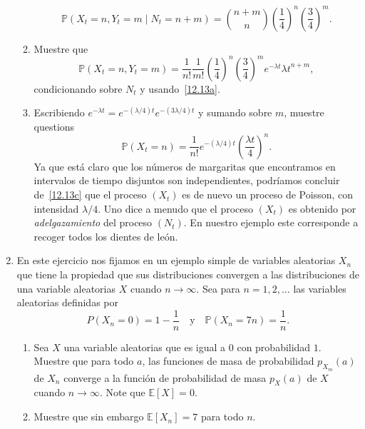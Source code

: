 \begin{enumerate}
\begin{enumerate}
           \begin{equation*}
             \mathds{P}\left(X_t=n,Y_t=m\mid N_t=n+m\right)=\binom{n+m}{n}{\left(\frac{1}{4}\right)}^n{\left(\frac{3}{4}\right)}^m.
           \end{equation*}
         \item Muestre que
           \begin{equation*}
             \mathds{P}\left(X_t=n,Y_t=m\right)=\frac{1}{n!}\frac{1}{m!}{\left(\frac{1}{4}\right)}^n{\left(\frac{3}{4}\right)}^me^{-\lambda t}{\lambda t}^{n+m},
           \end{equation*}
           condicionando sobre $N_t$ y usando~\ref{12.13a}.
         \item Escribiendo $e^{-\lambda t}=e^{-\left(\lambda/4\right)t}e^{-\left(3\lambda/4\right)t}$ y sumando sobre $m$, muestre questions\label{12.13c}
           \begin{equation*}
             \mathds{P}\left(X_t=n\right)=\frac{1}{n!}e^{-\left(\lambda/4\right)t}{\left(\frac{\lambda t}{4}\right)}^n.
           \end{equation*}
           Ya que está claro que los números de margaritas que encontramos en intervalos de tiempo disjuntos son independientes, podríamos concluir de~\ref{12.13c} que el proceso $\left(X_t\right)$ es de nuevo un proceso de Poisson, con intensidad $\lambda/4$. Uno dice a menudo que el proceso $\left(X_t\right)$ es obtenido por \emph{adelgazamiento} del proceso $\left(N_t\right)$. En nuestro ejemplo este corresponde a recoger todos los dientes de león.
         \end{enumerate}
         \item En este ejercicio nos fijamos en un ejemplo simple de variables aleatorias $X_n$ que tiene la propiedad que sus distribuciones convergen a las distribuciones de una variable aleatorias $X$ cuando $n\to\infty$. Sea para $n=1,2,\ldots$ las variables aleatorias definidas por
           \begin{equation*}
             P\left(X_n=0\right)=1-\frac{1}{n}\quad\text{y}\quad\mathds{P}\left(X_n=7n\right)=\frac{1}{n}.
           \end{equation*}
           \begin{enumerate}
           \item Sea $X$ una variable aleatorias que es igual a $0$ con probabilidad $1$. Muestre que para todo $a$, las funciones de masa de probabilidad $p_{X_m}(a)$ de $X_n$ converge a la función de probabilidad de masa $p_X(a)$ de $X$ cuando $n\to\infty$. Note que $\mathds{E}\left[X\right]=0$.
           \item Muestre que sin embargo $\mathds{E}\left[X_n\right]=7$ para todo $n$.
           \end{enumerate}
        \end{enumerate}

